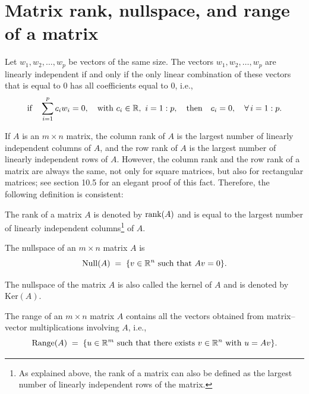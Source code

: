 
\section{Matrix rank, nullspace, and range of a matrix}

\begin{definition}
Let $w_1, w_2, \ldots, w_p$ be vectors of the same size. The vectors $w_1,
w_2, \ldots, w_p$ are linearly independent if and only if the only linear
combination of these vectors that is equal to 0 has all coefficients equal
to 0, i.e.,
\[
\text{if} \quad \sum_{i=1}^p c_iw_i = 0, \quad \text{with}\ c_i\in\mathbb{R},\
i=1:p, \quad \text{then} \quad c_i=0, \quad \forall\, i=1:p.
\]
\end{definition}

If $A$ is an $m\times n$ matrix, the column rank of $A$ is the largest
number of linearly independent columns of $A$, and the row rank of $A$ is
the largest number of linearly independent rows of $A$. However, the
column rank and the row rank of a matrix are always the same, not only for
square matrices, but also for rectangular matrices; see section 10.5 for an
elegant proof of this fact. Therefore, the following definition is
consistent:

\begin{definition}
The rank of a matrix $A$ is denoted by $\operatorname{rank}(A)$ and is equal to the
largest number of linearly independent columns\footnote{As explained
above, the rank of a matrix can also be defined as the largest number of
linearly independent rows of the matrix.} of $A$.
\end{definition}

\begin{definition}
The nullspace of an $m\times n$ matrix $A$ is
\[
\mathrm{Null}(A) \;=\; \{v\in\R^n \ \text{such that}\ Av=0\}.
\]
\end{definition}

The nullspace of the matrix $A$ is also called the kernel of $A$ and is
denoted by $\mathrm{Ker}(A)$.

\begin{definition}
The range of an $m\times n$ matrix $A$ contains all the vectors obtained
from matrix--vector multiplications involving $A$, i.e.,
\begin{equation}
\mathrm{Range}(A) \;=\; \{u\in\R^m \ \text{such that there exists}\ v\in\R^n
\ \text{with}\ u=Av\}.
\end{equation}
\end{definition}

